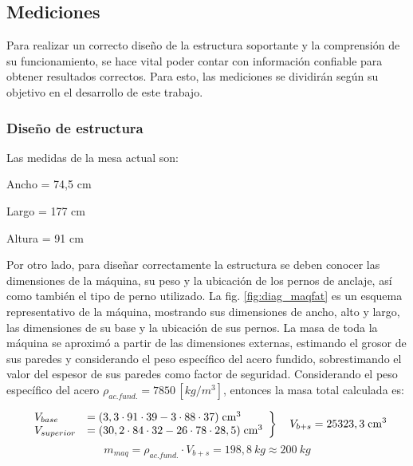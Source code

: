 \subsection{Mediciones}
\label{sec:mediciones_met}
Para realizar un correcto diseño de la estructura soportante y la comprensión de su funcionamiento, se hace vital poder contar con información confiable para obtener resultados correctos. Para esto, las mediciones se dividirán según su objetivo en el desarrollo de este trabajo.
\subsubsection{Diseño de estructura}
Las medidas de la mesa actual son: 
\begin{itemize*}
	\item Ancho = 74,5 cm
	\item Largo = 177 cm
	\item Altura = 91 cm
\end{itemize*}
Por otro lado, para diseñar correctamente la estructura se deben conocer las dimensiones de la máquina, su peso y la ubicación de los pernos de anclaje, así como también el tipo de perno utilizado. La fig. \ref{fig:diag_maqfat} es un esquema representativo de la máquina, mostrando sus dimensiones de ancho, alto y largo, las dimensiones de su base y la ubicación de sus pernos. La masa de toda la máquina se aproximó a partir de las dimensiones externas, estimando el grosor de sus paredes y considerando el peso específico del acero fundido, sobrestimando el valor del espesor de sus paredes como factor de seguridad. Considerando el peso específico del acero $\rho_{ac.fund.} = 7850 \, [kg/m^3]$, entonces la masa total calculada es:

\[ \left. 
\begin{array}{ll}
V_{base} &= (3,3\cdot 91\cdot 39 - 3\cdot 88\cdot 37)\; \text{cm}^3	\\
V_{superior} &=(30,2\cdot 84\cdot 32 - 26\cdot 78\cdot 28,5) \; \text{cm}^3	\\
\end{array}
\right\} \\
\quad V_{b+s} = 25323,3 \; \text{cm}^3 \]
\begin{equation}\label{eq:masa_maq}
	m_{maq} = \rho_{ac. fund.} \cdot V_{b+s} = 198,8 \: kg \approx 200 \: kg
\end{equation}

